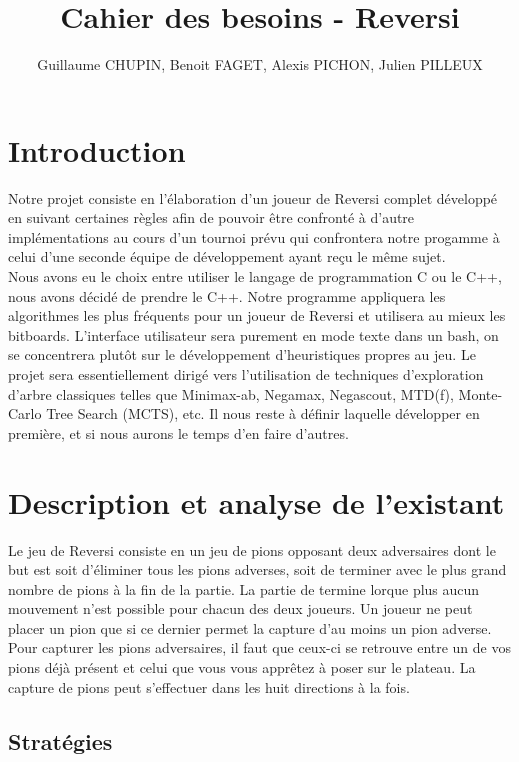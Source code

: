 \documentclass[10pt,a4paper]{article}
\title{Cahier des besoins - Reversi}
\author{Guillaume CHUPIN, Benoit FAGET, Alexis PICHON, Julien PILLEUX}
\begin{document}
\maketitle
\newpage
\tableofcontents
\newpage

\section{Introduction}

Notre projet consiste en l'élaboration d'un joueur de Reversi complet développé en suivant certaines règles afin de pouvoir être confronté à d'autre implémentations au cours d'un tournoi prévu qui confrontera notre progamme à celui d'une seconde équipe de développement ayant reçu le même sujet.\\

Nous avons eu le choix entre utiliser le langage de programmation C ou le C++, nous avons décidé de prendre le C++. Notre programme appliquera les algorithmes les plus fréquents pour un joueur de Reversi et utilisera au mieux les bitboards. L'interface utilisateur sera purement en mode texte dans un bash, on se concentrera plutôt sur le développement d'heuristiques propres au jeu. Le projet sera essentiellement dirigé vers l'utilisation de techniques d'exploration d'arbre classiques telles que Minimax-ab, Negamax, Negascout, MTD(f), Monte-Carlo Tree Search (MCTS), etc. Il nous reste à définir laquelle développer en première, et si nous aurons le temps d'en faire d'autres.

\section{Description et analyse de l'existant}

Le jeu de Reversi consiste en un jeu de pions opposant deux adversaires dont le but est soit d'éliminer tous les pions adverses, soit de terminer avec le plus grand nombre de pions à la fin de la partie. La partie de termine lorque plus aucun mouvement n'est possible pour chacun des deux joueurs. Un joueur ne peut placer un pion que si ce dernier permet la capture d'au moins un pion adverse. Pour capturer les pions adversaires, il faut que ceux-ci se retrouve entre un de vos pions déjà présent et celui que vous vous apprêtez à poser sur le plateau. La capture de pions peut s'effectuer dans les huit directions à la fois.

\subsection{Stratégies}
\end{document}
